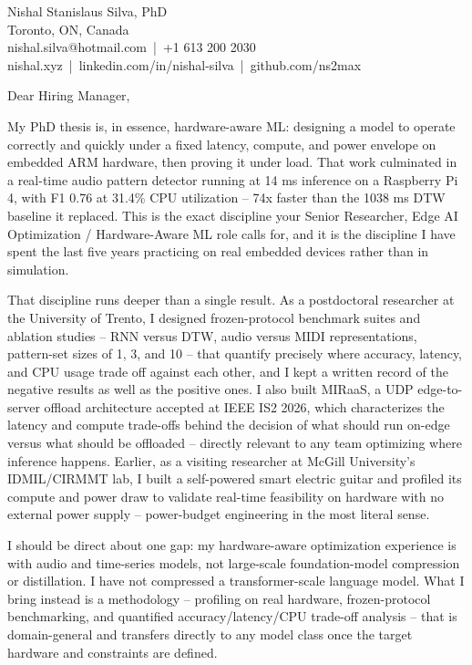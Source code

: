 \documentclass[11pt]{article}
\begin{document}
\pagestyle{empty}

\noindent
Nishal Stanislaus Silva, PhD \\
Toronto, ON, Canada \\
nishal.silva@hotmail.com \,|\, +1 613 200 2030 \\
nishal.xyz \,|\, linkedin.com/in/nishal-silva \,|\, github.com/ns2max

\vspace{1em}
\noindent Dear Hiring Manager,

\vspace{0.8em}
\noindent My PhD thesis is, in essence, hardware-aware ML: designing a model to operate correctly and quickly under a fixed latency, compute, and power envelope on embedded ARM hardware, then proving it under load. That work culminated in a real-time audio pattern detector running at 14 ms inference on a Raspberry Pi 4, with F1 0.76 at 31.4\% CPU utilization -- 74x faster than the 1038 ms DTW baseline it replaced. This is the exact discipline your Senior Researcher, Edge AI Optimization / Hardware-Aware ML role calls for, and it is the discipline I have spent the last five years practicing on real embedded devices rather than in simulation.

\vspace{0.8em}
\noindent That discipline runs deeper than a single result. As a postdoctoral researcher at the University of Trento, I designed frozen-protocol benchmark suites and ablation studies -- RNN versus DTW, audio versus MIDI representations, pattern-set sizes of 1, 3, and 10 -- that quantify precisely where accuracy, latency, and CPU usage trade off against each other, and I kept a written record of the negative results as well as the positive ones. I also built MIRaaS, a UDP edge-to-server offload architecture accepted at IEEE IS2 2026, which characterizes the latency and compute trade-offs behind the decision of what should run on-edge versus what should be offloaded -- directly relevant to any team optimizing where inference happens. Earlier, as a visiting researcher at McGill University's IDMIL/CIRMMT lab, I built a self-powered smart electric guitar and profiled its compute and power draw to validate real-time feasibility on hardware with no external power supply -- power-budget engineering in the most literal sense.

\vspace{0.8em}
\noindent I should be direct about one gap: my hardware-aware optimization experience is with audio and time-series models, not large-scale foundation-model compression or distillation. I have not compressed a transformer-scale language model. What I bring instead is a methodology -- profiling on real hardware, frozen-protocol benchmarking, and quantified accuracy/latency/CPU trade-off analysis -- that is domain-general and transfers directly to any model class once the target hardware and constraints are defined.
\end{document}
